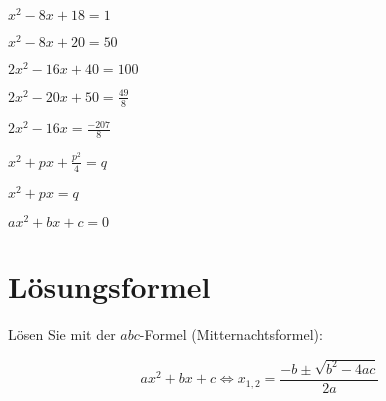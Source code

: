\begin{bbwAufgabenBlock}
\item $ x^2 -8x + 18 = 1$
\LoesungsBlock{$\lx = \left\{ \right\}$}

\item $x^2-8x+20 = 50  $

\item $ 2x^2 -16x + 40 = 100$

\item $ 2x^2 - 20x + 50 = \frac{49}{8} $

\item $ 2x^2 - 16 x= \frac{-207}{8}$

\item $ x^2 + px + \frac{p^2}{4}= q$

\item $ x^2 + px =  q$

\item $ ax^2+bx+c=0 $


\end{bbwAufgabenBlock}
\newpage


\section{Lösungsformel}
Lösen Sie mit der $abc$-Formel (Mitternachtsformel):

$$ax^2+bx+c \Longleftrightarrow x_{1,2}=\frac{-b\pm\sqrt{b^2-4ac}}{2a}$$

